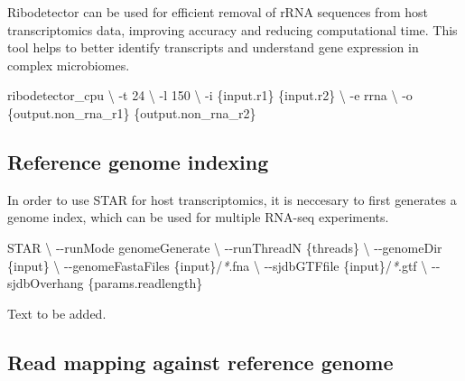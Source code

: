 \documentclass[
]{book}
\newenvironment{Shaded}{\begin{snugshade}}{\end{snugshade}}
\newcommand{\AttributeTok}[1]{\textcolor[rgb]{0.77,0.63,0.00}{#1}}
\newcommand{\DataTypeTok}[1]{\textcolor[rgb]{0.13,0.29,0.53}{#1}}
\newcommand{\ExtensionTok}[1]{#1}
\newcommand{\NormalTok}[1]{#1}
\newcommand{\PreprocessorTok}[1]{\textcolor[rgb]{0.56,0.35,0.01}{\textit{#1}}}
\begin{document}
Ribodetector can be used for efficient removal of rRNA sequences from host transcriptomics data, improving accuracy and reducing computational time. This tool helps to better identify transcripts and understand gene expression in complex microbiomes.

\begin{Shaded}
\begin{Highlighting}[]
\ExtensionTok{ribodetector\_cpu} \DataTypeTok{\textbackslash{}}
      \AttributeTok{{-}t}\NormalTok{ 24 }\DataTypeTok{\textbackslash{}}
      \AttributeTok{{-}l}\NormalTok{ 150 }\DataTypeTok{\textbackslash{}}
      \AttributeTok{{-}i}\NormalTok{ \{input.r1\} \{input.r2\} }\DataTypeTok{\textbackslash{}}
      \AttributeTok{{-}e}\NormalTok{ rrna }\DataTypeTok{\textbackslash{}}
      \AttributeTok{{-}o}\NormalTok{ \{output.non\_rna\_r1\} \{output.non\_rna\_r2\}}
\end{Highlighting}
\end{Shaded}

\hypertarget{reference-genome-indexing}{%
\subsection*{Reference genome indexing}\label{reference-genome-indexing}}

In order to use STAR for host transcriptomics, it is neccesary to first generates a genome index, which can be used for multiple RNA-seq experiments.

\begin{Shaded}
\begin{Highlighting}[]
\ExtensionTok{STAR} \DataTypeTok{\textbackslash{}}
      \AttributeTok{{-}{-}runMode}\NormalTok{ genomeGenerate }\DataTypeTok{\textbackslash{}}
      \AttributeTok{{-}{-}runThreadN}\NormalTok{ \{threads\} }\DataTypeTok{\textbackslash{}}
      \AttributeTok{{-}{-}genomeDir}\NormalTok{ \{input\} }\DataTypeTok{\textbackslash{}}
      \AttributeTok{{-}{-}genomeFastaFiles}\NormalTok{ \{input\}/}\PreprocessorTok{*}\NormalTok{.fna }\DataTypeTok{\textbackslash{}}
      \AttributeTok{{-}{-}sjdbGTFfile}\NormalTok{ \{input\}/}\PreprocessorTok{*}\NormalTok{.gtf }\DataTypeTok{\textbackslash{}}
      \AttributeTok{{-}{-}sjdbOverhang}\NormalTok{ \{params.readlength\}}
\end{Highlighting}
\end{Shaded}

Text to be added.

\hypertarget{read-mapping-against-reference-genome}{%
\subsection*{Read mapping against reference genome}\label{read-mapping-against-reference-genome}}
\end{document}
